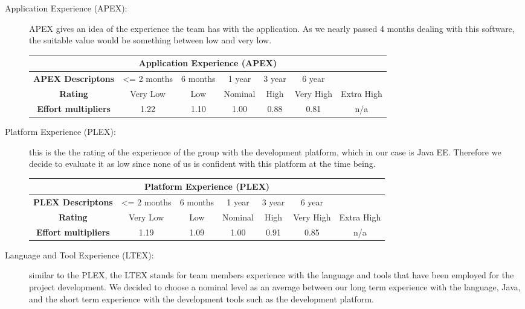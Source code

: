 \begin{description}
\item[Application Experience (APEX):] APEX gives an idea of the experience the team has with the application. As we nearly passed 4 months dealing with this software, the suitable value would be something between low and very low.

\begin{tabular}{ | c | c | c | c | c | c | c | }
\hline
         \multicolumn{7}{|c|}{\textbf{Application Experience (APEX)}} \\ \hline  \hline
         	\textbf{APEX Descriptons} & <= 2 months & 6 months&1 year & 3 year& 6 year&\\ \hline
	\textbf{Rating}&Very Low & Low & Nominal  & High & Very High &Extra High\\ \hline
	\textbf{Effort multipliers} & 1.22 & 1.10 & 1.00 & 0.88 & 0.81 & n/a \\ \hline
\end{tabular}

\item[Platform Experience (PLEX):] this is the the rating of the experience of the group with the development platform, which in our case is Java EE. Therefore we decide to evaluate it as low since none of us is confident with this platform at the time being.

\begin{tabular}{ | c | c | c | c | c | c | c | }
\hline
         \multicolumn{7}{|c|}{\textbf{Platform Experience (PLEX)}} \\ \hline  \hline
         	\textbf{PLEX Descriptons} & <= 2 months & 6 months &1 year & 3 year& 6 year&\\ \hline
	\textbf{Rating}&Very Low & Low & Nominal  & High & Very High &Extra High\\ \hline
	\textbf{Effort multipliers} & 1.19 & 1.09 & 1.00 & 0.91 & 0.85 & n/a \\ \hline
\end{tabular}

\item[Language and Tool Experience (LTEX):] similar to the PLEX, the LTEX stands for team members experience with the language and tools that have been employed for the project development. We decided to choose a nominal level as an average between our long term experience with the language, Java, and the short term experience with the development tools such as the development platform.


\end{description}
